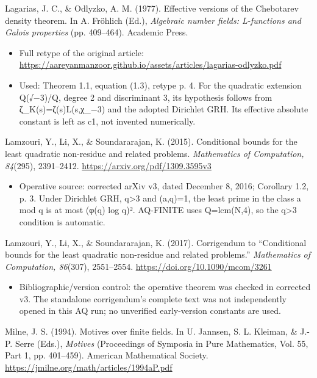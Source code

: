 \documentclass[11pt,a4paper]{article}
\providecommand{\tightlist}{\setlength{\itemsep}{0pt}\setlength{\parskip}{0pt}}
\theoremstyle{definition}\newtheorem{definition}[theorem]{Definition}
\theoremstyle{remark}\newtheorem{remark}[theorem]{Remark}
\begin{document}
Lagarias, J. C., \& Odlyzko, A. M. (1977). Effective versions of the
Chebotarev density theorem. In A. Fröhlich (Ed.), \emph{Algebraic number
fields: L-functions and Galois properties} (pp. 409--464). Academic
Press.

\begin{itemize}
\tightlist
\item
  Full retype of the original article:
  \url{https://aareyanmanzoor.github.io/assets/articles/lagarias-odlyzko.pdf}
\item
  Used: Theorem 1.1, equation (1.3), retype p. 4. For the quadratic
  extension Q(√−3)/Q, degree 2 and discriminant 3, its hypothesis
  follows from ζ\_K(s)=ζ(s)L(s,χ\_−3) and the adopted Dirichlet GRH. Its
  effective absolute constant is left as c1, not invented numerically.
\end{itemize}

Lamzouri, Y., Li, X., \& Soundararajan, K. (2015). Conditional bounds
for the least quadratic non-residue and related problems.
\emph{Mathematics of Computation, 84}(295), 2391--2412.
\url{https://arxiv.org/pdf/1309.3595v3}

\begin{itemize}
\tightlist
\item
  Operative source: corrected arXiv v3, dated December 8, 2016;
  Corollary 1.2, p. 3. Under Dirichlet GRH, q\textgreater3 and (a,q)=1,
  the least prime in the class a mod q is at most (φ(q) log q)².
  AQ-FINITE uses Q=lcm(N,4), so the q\textgreater3 condition is
  automatic.
\end{itemize}

Lamzouri, Y., Li, X., \& Soundararajan, K. (2017). Corrigendum to
``Conditional bounds for the least quadratic non-residue and related
problems.'' \emph{Mathematics of Computation, 86}(307), 2551--2554.
\url{https://doi.org/10.1090/mcom/3261}

\begin{itemize}
\tightlist
\item
  Bibliographic/version control: the operative theorem was checked in
  corrected v3. The standalone corrigendum's complete text was not
  independently opened in this AQ run; no unverified early-version
  constants are used.
\end{itemize}

Milne, J. S. (1994). Motives over finite fields. In U. Jannsen, S. L.
Kleiman, \& J.-P. Serre (Eds.), \emph{Motives} (Proceedings of Symposia
in Pure Mathematics, Vol. 55, Part 1, pp. 401--459). American
Mathematical Society. \url{https://jmilne.org/math/articles/1994aP.pdf}
\end{document}
